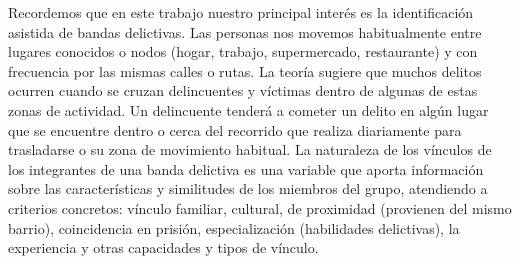 Recordemos que en este trabajo nuestro principal interés es la identificación asistida de bandas delictivas. 
Las personas nos movemos habitualmente entre lugares conocidos o nodos (hogar, trabajo, supermercado, restaurante) y con frecuencia por las mismas calles o rutas. La teoría sugiere que muchos delitos ocurren cuando se cruzan delincuentes y víctimas dentro de algunas de estas zonas de actividad.
Un delincuente tenderá a cometer un delito en algún lugar que se encuentre dentro o cerca del recorrido que realiza diariamente para trasladarse o su zona de movimiento habitual.
La naturaleza de los vínculos de los integrantes de una banda delictiva es una variable que aporta información sobre las características y similitudes de los miembros del grupo, atendiendo a criterios concretos: vínculo familiar, cultural, de proximidad (provienen del mismo barrio), coincidencia en prisión, especialización (habilidades delictivas), la experiencia y otras capacidades y   tipos de vínculo.
